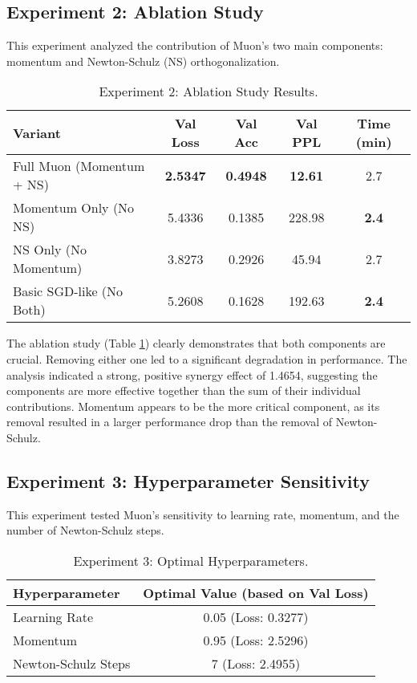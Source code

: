 \documentclass[11pt, a4paper]{article}
\begin{document}
\subsection{Experiment 2: Ablation Study}
This experiment analyzed the contribution of Muon's two main components: momentum and Newton-Schulz (NS) orthogonalization.

\begin{table}[h!]
\centering
\caption{Experiment 2: Ablation Study Results.}
\label{tab:exp2}
\begin{tabular}{@{}lcccc@{}}
\toprule
Variant & Val Loss & Val Acc & Val PPL & Time (min) \\ \midrule
Full Muon (Momentum + NS) & \textbf{2.5347} & \textbf{0.4948} & \textbf{12.61} & 2.7 \\
Momentum Only (No NS) & 5.4336 & 0.1385 & 228.98 & \textbf{2.4} \\
NS Only (No Momentum) & 3.8273 & 0.2926 & 45.94 & 2.7 \\
Basic SGD-like (No Both) & 5.2608 & 0.1628 & 192.63 & \textbf{2.4} \\ \bottomrule
\end{tabular}
\end{table}

The ablation study (Table \ref{tab:exp2}) clearly demonstrates that both components are crucial. Removing either one led to a significant degradation in performance. The analysis indicated a strong, positive synergy effect of 1.4654, suggesting the components are more effective together than the sum of their individual contributions. Momentum appears to be the more critical component, as its removal resulted in a larger performance drop than the removal of Newton-Schulz.

\subsection{Experiment 3: Hyperparameter Sensitivity}
This experiment tested Muon's sensitivity to learning rate, momentum, and the number of Newton-Schulz steps.

\begin{table}[h!]
\centering
\caption{Experiment 3: Optimal Hyperparameters.}
\label{tab:exp3}
\begin{tabular}{@{}lc@{}}
\toprule
Hyperparameter & Optimal Value (based on Val Loss) \\ \midrule
Learning Rate & 0.05 (Loss: 0.3277) \\
Momentum & 0.95 (Loss: 2.5296) \\
Newton-Schulz Steps & 7 (Loss: 2.4955) \\ \bottomrule
\end{tabular}
\end{table}
\end{document}
